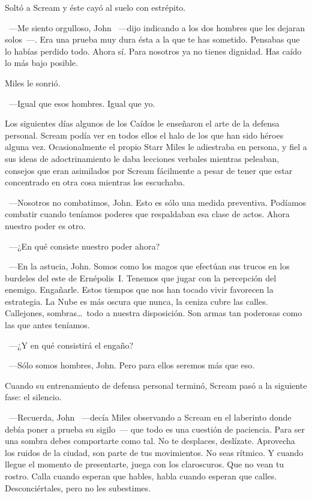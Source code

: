 Soltó a Scream y éste cayó al suelo con estrépito.

~---Me siento orgulloso, John ~---dijo indicando a los dos hombres que les dejaran solos~---. Era una prueba muy dura ésta a la que te has sometido. Pensabas que lo habías perdido todo. Ahora sí. Para nosotros ya no tienes dignidad. Has caído lo más bajo posible.

Miles le sonrió.

~---Igual que esos hombres. Igual que yo.

Los siguientes días algunos de los Caídos le enseñaron el arte de la defensa personal. Scream podía ver en todos ellos el halo de los que han sido héroes alguna vez. Ocasionalmente el propio Starr Miles le adiestraba en persona, y fiel a sus ideas de adoctrinamiento le daba lecciones verbales mientras peleaban, consejos que eran asimilados por Scream fácilmente a pesar de tener que estar concentrado en otra cosa mientras los escuchaba.

~---Nosotros no combatimos, John. Esto es sólo una medida preventiva. Podíamos combatir cuando teníamos poderes que respaldaban esa clase de actos. Ahora nuestro poder es otro.

~---¿En qué consiste nuestro poder ahora?

~---En la astucia, John. Somos como los magos que efectúan sus trucos en los burdeles del este de Ernépolis~I. Tenemos que jugar con la percepción del enemigo. Engañarle. Estos tiempos que nos han tocado vivir favorecen la estrategia. La Nube es más oscura que nunca, la ceniza cubre las calles. Callejones, sombras\dots\ todo a nuestra disposición. Son armas tan poderosas como las que antes teníamos.

~---¿Y en qué consistirá el engaño?

~---Sólo somos hombres, John. Pero para ellos seremos más que eso.

Cuando su entrenamiento de defensa personal terminó, Scream pasó a la siguiente fase: el silencio.

~---Recuerda, John ~---decía Miles observando a Scream en el laberinto donde debía poner a prueba su sigilo~--- que todo es una cuestión de paciencia. Para ser una sombra debes comportarte como tal. No te desplaces, deslízate. Aprovecha los ruidos de la ciudad, son parte de tus movimientos. No seas rítmico. Y cuando llegue el momento de presentarte, juega con los claroscuros. Que no vean tu rostro. Calla cuando esperan que hables, habla cuando esperan que calles. Desconciértales, pero no les subestimes.

